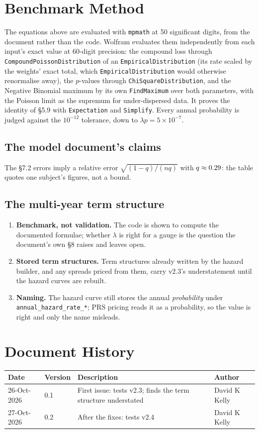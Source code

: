 \documentclass[11pt,a4paper]{article}
\renewcommand{\mkmhistorypage}[1]{%
    \section{Document History}
    \begin{table}[ht]
        \centering
        \begin{tabular}{l|l|p{9cm}|l}
            \textbf{Date} & \textbf{Version} & \textbf{Description} & \textbf{Author} \\
            \hline
            #1
        \end{tabular}
    \end{table}
}
\begin{document}
\section{Benchmark Method}

The equations above are evaluated with \texttt{mpmath} at 50 significant digits, from
the document rather than the code. Wolfram evaluates them independently from each
input's exact value at 60-digit precision: the compound loss through
\texttt{CompoundPoissonDistribution} of an \texttt{EmpiricalDistribution} (its rate
scaled by the weights' exact total, which \texttt{EmpiricalDistribution} would
otherwise renormalise away), the $p$-values through \texttt{ChiSquareDistribution},
and the Negative Binomial maximum by its own \texttt{FindMaximum} over both
parameters, with the Poisson limit as the supremum for under-dispersed data. It
proves the identity of \S5.9 with \texttt{Expectation} and \texttt{Simplify}.
Every annual probability is judged against the $10^{-12}$ tolerance, down to
$\lambda p=5\times10^{-7}$.

\mkmvalidation



\subsection{The model document's claims}


\noindent The \S7.2 errors imply a relative error $\sqrt{(1-q)/(nq)}$ with
$q\approx0.29$: the table quotes one subject's figures, not a bound.

\subsection{The multi-year term structure}


\mkmlimitations

\begin{enumerate}[leftmargin=*]
\item \textbf{Benchmark, not validation.} The code is shown to compute the
  documented formulae; whether $\lambda$ is right for a gauge is the question the
  document's own \S8 raises and leaves open.
\item \textbf{Stored term structures.} Term structures already written by the hazard
  builder, and any spreads priced from them, carry v2.3's understatement until the
  hazard curves are rebuilt.
\item \textbf{Naming.} The hazard curve still stores the annual \emph{probability}
  under \texttt{annual\_hazard\_rate\_*}; PRS pricing reads it as a probability, so
  the value is right and only the name misleads.
\end{enumerate}

\mkmhistorypage{26-Oct-2026 & 0.1 & First issue: tests v2.3; finds the term structure understated & David K Kelly \\
27-Oct-2026 & 0.2 & After the fixes: tests v2.4 & David K Kelly \\}
\end{document}
